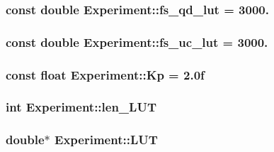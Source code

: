 \subsubsection[{\texorpdfstring{fs\+\_\+qd\+\_\+lut}{fs_qd_lut}}]{\setlength{\rightskip}{0pt plus 5cm}const double Experiment\+::fs\+\_\+qd\+\_\+lut = 3000.}\hypertarget{classExperiment_a04ef11e89995e42aee1b89d5bba35aae}{}\label{classExperiment_a04ef11e89995e42aee1b89d5bba35aae}
\subsubsection[{\texorpdfstring{fs\+\_\+uc\+\_\+lut}{fs_uc_lut}}]{\setlength{\rightskip}{0pt plus 5cm}const double Experiment\+::fs\+\_\+uc\+\_\+lut = 3000.}\hypertarget{classExperiment_a64ab0761b30b073656aa75760d2e230d}{}\label{classExperiment_a64ab0761b30b073656aa75760d2e230d}
\subsubsection[{\texorpdfstring{Kp}{Kp}}]{\setlength{\rightskip}{0pt plus 5cm}const float Experiment\+::\+Kp = 2.\+0f}\hypertarget{classExperiment_a03450b58564f4dbecb58e773e1cf5e8b}{}\label{classExperiment_a03450b58564f4dbecb58e773e1cf5e8b}
\subsubsection[{\texorpdfstring{len\+\_\+\+L\+UT}{len_LUT}}]{\setlength{\rightskip}{0pt plus 5cm}int Experiment\+::len\+\_\+\+L\+UT}\hypertarget{classExperiment_af6e1965489695707f8de14f8ee5b09a1}{}\label{classExperiment_af6e1965489695707f8de14f8ee5b09a1}
\subsubsection[{\texorpdfstring{L\+UT}{LUT}}]{\setlength{\rightskip}{0pt plus 5cm}double$\ast$ Experiment\+::\+L\+UT}\hypertarget{classExperiment_abfa65531d9549c3df64e52a77a93352e}{}\label{classExperiment_abfa65531d9549c3df64e52a77a93352e}
